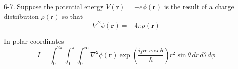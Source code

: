 \documentclass[12pt]{article}
\begin{document}
6-7.
Suppose the potential energy $V(\mathbf r)=-e\phi(\mathbf r)$
is the result of a charge distribution $\rho(\mathbf r)$ so that
\begin{equation*}
\nabla^2\phi(\mathbf r)=-4\pi\rho(\mathbf r)
\tag{6.48}
\end{equation*}

In polar coordinates
\begin{equation*}
I=\int_0^{2\pi}\int_0^\pi\int_0^\infty
\nabla^2\phi(\mathbf r)
\exp\left(\frac{ipr\cos\theta}{\hbar}\right)
r^2\sin\theta\,dr\,d\theta\,d\phi
\end{equation*}
\end{document}
